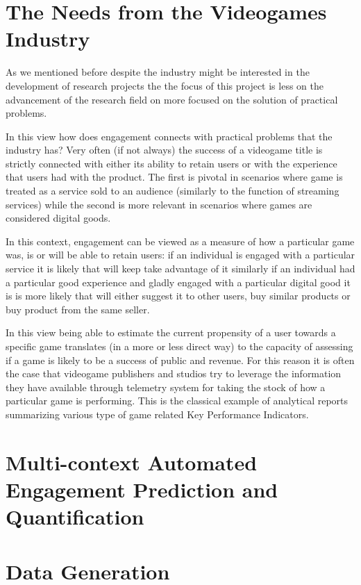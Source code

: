 \section{The Needs from the Videogames Industry}
\label{industry_needs}
As we mentioned before despite the industry might be interested in the development of research projects the the focus of this project is less on the advancement of the research field on more focused on the solution of practical problems. 

In this view how does engagement connects with practical problems that the industry has? Very often (if not always) the success of a videogame title is strictly connected with either its ability to retain users or with the experience that users had with the product. The first is pivotal in scenarios where game is treated as a service sold to an audience (similarly to the function of streaming services) while the second is more relevant in scenarios where games are considered digital goods. 

In this context, engagement can be viewed as a measure of how a particular game was, is or will be able to retain users: if an individual is engaged with a particular service it is likely that will keep take advantage of it similarly if an individual had a particular good experience and gladly engaged with a particular digital good it is is more likely that will either suggest it to other users, buy similar products or buy product from the same seller.  

In this view being able to estimate the current propensity of a user towards a specific game translates (in a more or less direct way) to the capacity of assessing if a game is likely to be a success of public and revenue. For this reason it is often the case that videogame publishers and studios try to leverage the information they have available through telemetry system for taking the stock of how a particular game is performing. This is the classical example of analytical reports summarizing various type of game related Key Performance Indicators. 

\section{Multi-context Automated Engagement Prediction and Quantification}
\label{industry_needs}

\section{Data Generation}
\lorem
